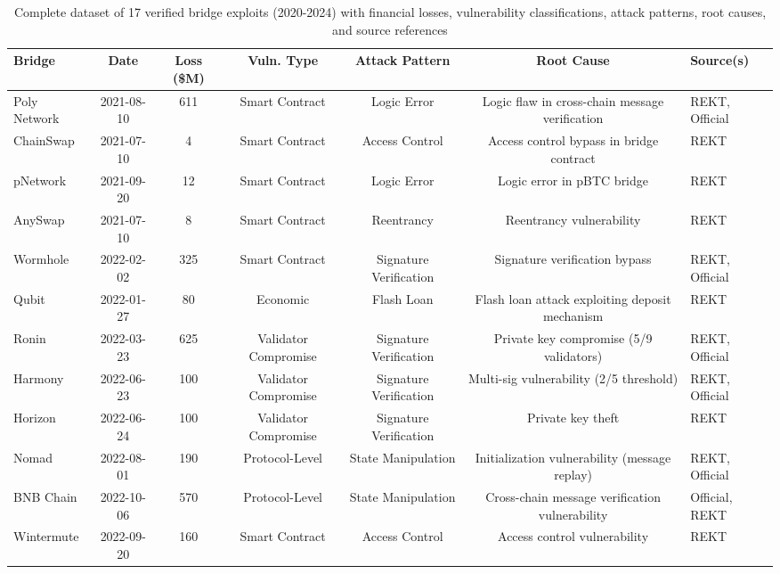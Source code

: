 \documentclass[runningheads]{llncs}
\begin{document}
\begin{table}[!ht]
    \centering
    \scriptsize
    \caption{Complete dataset of 17 verified bridge exploits (2020-2024) with financial losses, vulnerability classifications, attack patterns, root causes, and source references}
    \label{tab:detailed_vulnerabilities}
    \begin{tabular}{lcccccp{3.5cm}}
        \toprule
        \textbf{Bridge} & \textbf{Date} & \textbf{Loss (\$M)} & \textbf{Vuln. Type} & \textbf{Attack Pattern} & \textbf{Root Cause} & \textbf{Source(s)} \\
        \midrule
        Poly Network & 2021-08-10 & 611 & Smart Contract & Logic Error & Logic flaw in cross-chain message verification & REKT, Official \\
        ChainSwap & 2021-07-10 & 4 & Smart Contract & Access Control & Access control bypass in bridge contract & REKT \\
        pNetwork & 2021-09-20 & 12 & Smart Contract & Logic Error & Logic error in pBTC bridge & REKT \\
        AnySwap & 2021-07-10 & 8 & Smart Contract & Reentrancy & Reentrancy vulnerability & REKT \\
        Wormhole & 2022-02-02 & 325 & Smart Contract & Signature Verification & Signature verification bypass & REKT, Official \\
        Qubit & 2022-01-27 & 80 & Economic & Flash Loan & Flash loan attack exploiting deposit mechanism & REKT \\
        Ronin & 2022-03-23 & 625 & Validator Compromise & Signature Verification & Private key compromise (5/9 validators) & REKT, Official \\
        Harmony & 2022-06-23 & 100 & Validator Compromise & Signature Verification & Multi-sig vulnerability (2/5 threshold) & REKT, Official \\
        Horizon & 2022-06-24 & 100 & Validator Compromise & Signature Verification & Private key theft & REKT \\
        Nomad & 2022-08-01 & 190 & Protocol-Level & State Manipulation & Initialization vulnerability (message replay) & REKT, Official \\
        BNB Chain & 2022-10-06 & 570 & Protocol-Level & State Manipulation & Cross-chain message verification vulnerability & Official, REKT \\
        Wintermute & 2022-09-20 & 160 & Smart Contract & Access Control & Access control vulnerability & REKT \\

\end{tabular}
\end{table}
\end{document}
